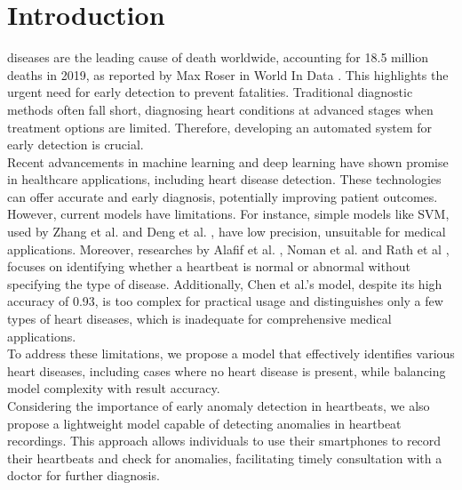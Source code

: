 \vfill
\section{Introduction}
 diseases are the leading cause of death worldwide, accounting for 18.5 million deaths in 2019, as reported
by Max Roser in World In Data \citeyear{owid-causes-of-death-treemap} \cite{owid-causes-of-death-treemap}.
This highlights the urgent need for early detection to prevent fatalities. Traditional diagnostic methods often fall short,
diagnosing heart conditions at advanced stages when treatment options are limited. Therefore, developing an automated system for early detection is crucial.\\
Recent advancements in machine learning and deep learning have shown promise in healthcare applications, including heart disease detection.
These technologies can offer accurate and early diagnosis, potentially improving patient outcomes. However, current models have limitations.
For instance, simple models like SVM, used by Zhang et al. \cite{Zhang_Han_Deng_2017} and Deng et al. \cite{Deng_Han_2016}, have low precision,
unsuitable for medical applications. Moreover, researches by Alafif et al. \cite{Alafif_Boulares_Barnawi_Alafif_Althobaiti_Alferaidi_2020},
Noman et al. \cite{Noman_Ting_Salleh_Ombao_2019} and Rath et al \cite{Rath_Mishra_Panda_Pal_2022}, focuses on identifying whether a heartbeat is normal or abnormal without specifying the
type of disease. Additionally, Chen et al.'s \cite{Chen_Ren_Hao_Hu_2018} model, despite its high accuracy of 0.93,
is too complex for practical usage and distinguishes only a few types of heart diseases, which is inadequate for comprehensive medical applications.\\
To address these limitations, we propose a model that effectively identifies various heart diseases, including cases where no heart disease is present,
while balancing model complexity with result accuracy.\\
Considering the importance of early anomaly detection in heartbeats, we also propose a lightweight
model capable of detecting anomalies in heartbeat recordings. This approach allows individuals to use their smartphones to record their heartbeats and check for anomalies,
facilitating timely consultation with a doctor for further diagnosis.



